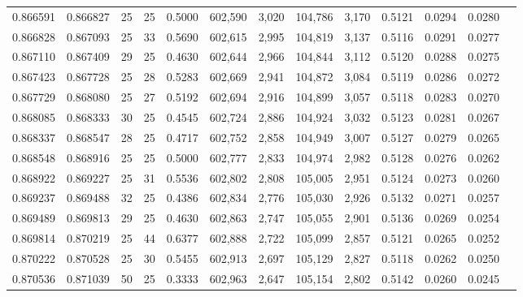 \begin{tabular}{rrrrrrrrrrrrr}
0.866591 & 0.866827 &    25 &  25 &                                     0.5000 & 602,590 &   3,020 & 104,786 &   3,170 & 0.5121 & 0.0294 & 0.0280 \\
0.866828 & 0.867093 &    25 &  33 &                                     0.5690 & 602,615 &   2,995 & 104,819 &   3,137 & 0.5116 & 0.0291 & 0.0277 \\
0.867110 & 0.867409 &    29 &  25 &                                     0.4630 & 602,644 &   2,966 & 104,844 &   3,112 & 0.5120 & 0.0288 & 0.0275 \\
0.867423 & 0.867728 &    25 &  28 &                                     0.5283 & 602,669 &   2,941 & 104,872 &   3,084 & 0.5119 & 0.0286 & 0.0272 \\
0.867729 & 0.868080 &    25 &  27 &                                     0.5192 & 602,694 &   2,916 & 104,899 &   3,057 & 0.5118 & 0.0283 & 0.0270 \\
0.868085 & 0.868333 &    30 &  25 &                                     0.4545 & 602,724 &   2,886 & 104,924 &   3,032 & 0.5123 & 0.0281 & 0.0267 \\
0.868337 & 0.868547 &    28 &  25 &                                     0.4717 & 602,752 &   2,858 & 104,949 &   3,007 & 0.5127 & 0.0279 & 0.0265 \\
0.868548 & 0.868916 &    25 &  25 &                                     0.5000 & 602,777 &   2,833 & 104,974 &   2,982 & 0.5128 & 0.0276 & 0.0262 \\
0.868922 & 0.869227 &    25 &  31 &                                     0.5536 & 602,802 &   2,808 & 105,005 &   2,951 & 0.5124 & 0.0273 & 0.0260 \\
0.869237 & 0.869488 &    32 &  25 &                                     0.4386 & 602,834 &   2,776 & 105,030 &   2,926 & 0.5132 & 0.0271 & 0.0257 \\
0.869489 & 0.869813 &    29 &  25 &                                     0.4630 & 602,863 &   2,747 & 105,055 &   2,901 & 0.5136 & 0.0269 & 0.0254 \\
0.869814 & 0.870219 &    25 &  44 &                                     0.6377 & 602,888 &   2,722 & 105,099 &   2,857 & 0.5121 & 0.0265 & 0.0252 \\
0.870222 & 0.870528 &    25 &  30 &                                     0.5455 & 602,913 &   2,697 & 105,129 &   2,827 & 0.5118 & 0.0262 & 0.0250 \\
0.870536 & 0.871039 &    50 &  25 &                                     0.3333 & 602,963 &   2,647 & 105,154 &   2,802 & 0.5142 & 0.0260 & 0.0245 \\

\end{tabular}
